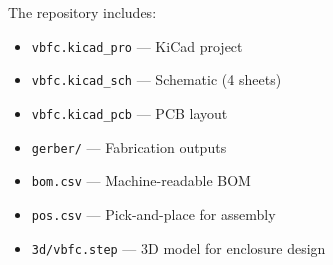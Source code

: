 The repository includes:
\begin{itemize}
    \item \texttt{vbfc.kicad\_pro} — KiCad project
    \item \texttt{vbfc.kicad\_sch} — Schematic (4 sheets)
    \item \texttt{vbfc.kicad\_pcb} — PCB layout
    \item \texttt{gerber/} — Fabrication outputs
    \item \texttt{bom.csv} — Machine-readable BOM
    \item \texttt{pos.csv} — Pick-and-place for assembly
    \item \texttt{3d/vbfc.step} — 3D model for enclosure design
\end{itemize}